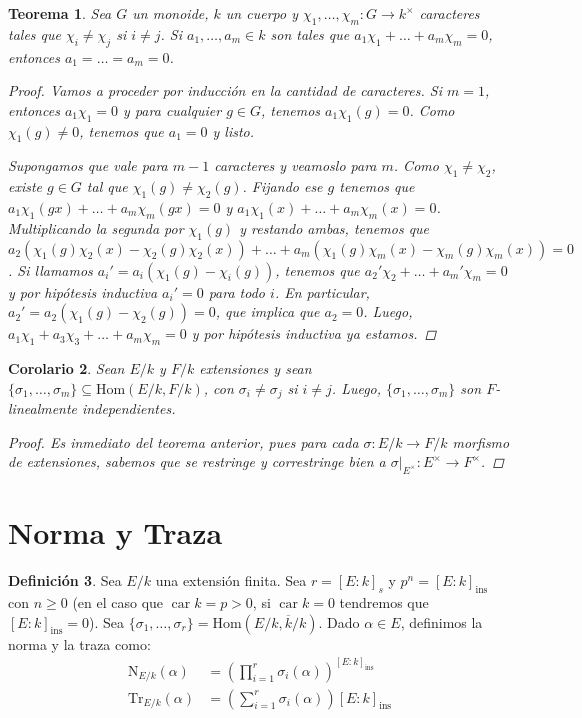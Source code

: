 \documentclass[12pt]{book}
\newtheorem{teo}{Teorema}[section]
\newtheorem{cor}[teo]{Corolario}
\theoremstyle{definition}
\newtheorem{defn}[teo]{Definición}
\renewcommand{\hom}{\mathrm{Hom}}
\DeclareMathOperator{\car}{car}
\begin{document}
\begin{teo}
Sea $G$ un monoide, $k$ un cuerpo y $\chi_1,\ldots , \chi_m:G\to k^\times$ caracteres tales que $\chi_i \neq \chi_j$ si $i\neq j$. Si $a_1,\ldots ,a_m\in k$ son tales que $a_1\chi_1 + \ldots + a_m\chi_m = 0$, entonces $a_1=\ldots = a_m = 0$.
\begin{proof}
Vamos a proceder por inducción en la cantidad de caracteres. Si $m=1$, entonces $a_1\chi_1 = 0$ y para cualquier $g\in G$, tenemos $a_1\chi_1(g)=0$. Como $\chi_1(g)\neq 0$, tenemos que $a_1=0$ y listo.

Supongamos que vale para $m-1$ caracteres y veamoslo para $m$. Como $\chi_1\neq \chi_2$, existe $g\in G$ tal que $\chi_1(g)\neq\chi_2(g)$. Fijando ese $g$ tenemos que $a_1\chi_1(gx)+\ldots + a_m\chi_m(gx) = 0$ y $a_1\chi_1(x) + \ldots + a_m\chi_m(x)=0$. Multiplicando la segunda por $\chi_1(g)$ y restando ambas, tenemos que $a_2(\chi_1(g)\chi_2(x) - \chi_2(g)\chi_2(x)) + \ldots + a_m(\chi_1(g)\chi_m(x) - \chi_m(g)\chi_m(x)) = 0$. Si llamamos $a_i' = a_i(\chi_1(g)-\chi_i(g))$, tenemos que $a_2'\chi_2 + \ldots + a_m'\chi_m = 0$ y por hipótesis inductiva $a_i'=0$ para todo $i$. En particular, $a_2' = a_2 (\chi_1(g) - \chi_2(g))=0$, que implica que $a_2=0$. Luego, $a_1\chi_1 + a_3\chi_3 + \ldots + a_m\chi_m=0$ y por hipótesis inductiva ya estamos.
\end{proof}
\end{teo}

\begin{cor}
Sean $E/k$ y  $F/k$ extensiones y sean $\{\sigma_1,\ldots , \sigma_m\}\subseteq \hom(E/k,F/k)$, con $\sigma_i\neq\sigma_j$ si $i\neq j$. Luego, $\{\sigma_1,\ldots , \sigma_m\}$ son $F$-linealmente independientes.
\begin{proof}
Es inmediato del teorema anterior, pues para cada $\sigma:E/k\to F/k$ morfismo de extensiones, sabemos que se restringe y correstringe bien a $\left.\sigma\right|_{E^\times}:E^\times \to F^\times$.
\end{proof}
\end{cor}

\section{Norma y Traza}

\begin{defn}
Sea $E/k$ una extensión finita. Sea $r=[E:k]_s$ y $p^n = [E:k]_{\text{ins}}$ con $n\geq 0$ (en el caso que $\car k = p>0$, si $\car k = 0$ tendremos que $[E:k]_{\text{ins}}=0$). Sea $\{\sigma_1,\ldots ,\sigma_r\} = \hom(E/k,\overline{k}/k)$. Dado $\alpha\in E$, definimos la norma y la traza como: \begin{align*}\mathrm{N}_{E/k}(\alpha) &= \left(\displaystyle\prod_{i=1}^r \sigma_i(\alpha)\right)^{[E:k]_{\text{ins}}} \\ \mathrm{Tr}_{E/k}(\alpha) &= \left(\displaystyle\sum_{i=1}^r \sigma_i(\alpha)\right)[E:k]_{\text{ins}}\end{align*}
\end{defn}
\end{document}
